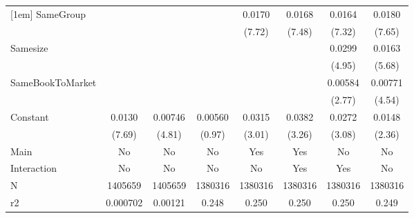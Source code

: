 {\begin{tabular}{l*{7}{c}}
[1em]
SameGroup           &                     &                     &                     &      0.0170\sym{***}&      0.0168\sym{***}&      0.0164\sym{***}&      0.0180\sym{***}\\
                    &                     &                     &                     &      (7.72)         &      (7.48)         &      (7.32)         &      (7.65)         \\
[1em]
Samesize            &                     &                     &                     &                     &                     &      0.0299\sym{***}&      0.0163\sym{***}\\
                    &                     &                     &                     &                     &                     &      (4.95)         &      (5.68)         \\
[1em]
SameBookToMarket    &                     &                     &                     &                     &                     &     0.00584\sym{**} &     0.00771\sym{***}\\
                    &                     &                     &                     &                     &                     &      (2.77)         &      (4.54)         \\
[1em]
Constant            &      0.0130\sym{***}&     0.00746\sym{***}&     0.00560         &      0.0315\sym{**} &      0.0382\sym{**} &      0.0272\sym{**} &      0.0148\sym{*}  \\
                    &      (7.69)         &      (4.81)         &      (0.97)         &      (3.01)         &      (3.26)         &      (3.08)         &      (2.36)         \\
\hline
Main                &          No         &          No         &          No         &         Yes         &         Yes         &          No         &          No         \\
Interaction         &          No         &          No         &          No         &          No         &         Yes         &         Yes         &          No         \\
N                   &     1405659         &     1405659         &     1380316         &     1380316         &     1380316         &     1380316         &     1380316         \\
r2                  &    0.000702         &     0.00121         &       0.248         &       0.250         &       0.250         &       0.250         &       0.249         \\

\end{tabular}}
